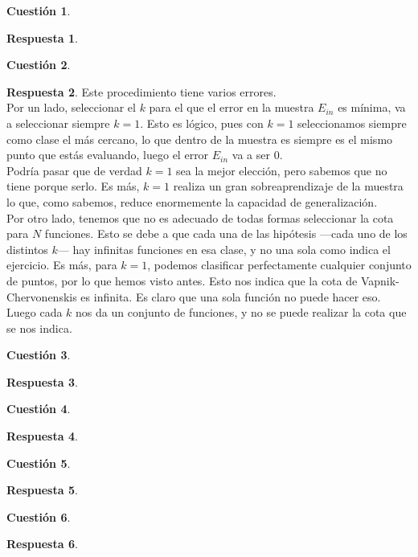 \documentclass[10pt,a4paper]{article}
\theoremstyle{definition}
\newtheorem{cuestion}{Cuestión}
\newtheorem*{respuesta}{Respuesta}
\begin{document}
\begin{cuestion}
\end{cuestion}
\begin{respuesta}
\end{respuesta}

\begin{cuestion}
\end{cuestion}
\begin{respuesta}
Este procedimiento tiene varios errores.\\

Por un lado, seleccionar el $k$ para el que el error en la muestra $E_{in}$ es mínima, va a seleccionar siempre $k=1$. Esto es lógico, pues con $k=1$ seleccionamos siempre como clase el más cercano, lo que dentro de la muestra es siempre es el mismo punto que estás evaluando, luego el error $E_{in}$ va a ser 0.\\

Podría pasar que de verdad $k=1$ sea la mejor elección, pero sabemos que no tiene porque serlo. Es más, $k=1$ realiza un gran sobreaprendizaje de la muestra lo que, como sabemos, reduce enormemente la capacidad de generalización.\\
  
Por otro lado, tenemos que no es adecuado de todas formas seleccionar la cota para $N$ funciones. Esto se debe a que cada una de las hipótesis ---cada uno de los distintos $k$--- hay infinitas funciones en esa clase, y no una sola como indica el ejercicio. Es más, para $k=1$, podemos clasificar perfectamente cualquier conjunto de puntos, por lo que hemos visto antes. Esto nos indica que la cota de Vapnik-Chervonenskis es infinita. Es claro que una sola función no puede hacer eso. Luego cada $k$ nos da un conjunto de funciones, y no se puede realizar la cota que se nos indica.\\
  
\end{respuesta}

\begin{cuestion}
\end{cuestion}
\begin{respuesta}
\end{respuesta}

\begin{cuestion}
\end{cuestion}
\begin{respuesta}
\end{respuesta}

\begin{cuestion}
\end{cuestion}
\begin{respuesta}
\end{respuesta}

\begin{cuestion}
\end{cuestion}
\begin{respuesta}
\end{respuesta}
\end{document}
